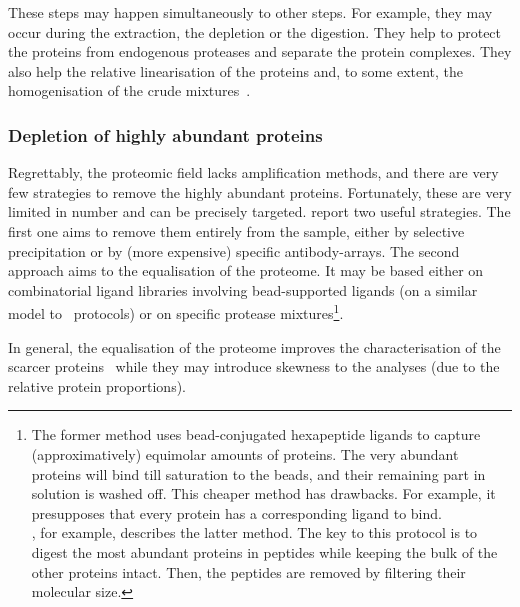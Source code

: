 These steps may happen simultaneously to other steps. For example, they may
occur during the extraction, the depletion or the digestion. They help to protect
the proteins from endogenous proteases and separate the protein complexes. They
also help the relative linearisation of the proteins and, to some extent,
the homogenisation of the crude mixtures~.

\subsubsection{Depletion of highly abundant proteins}

Regrettably, the proteomic field lacks amplification methods, and
there are very few strategies to remove the highly abundant proteins. Fortunately,
these are very limited in number and can be precisely targeted.
\citet{Zhang2014} report two useful strategies. The first one aims to remove
them entirely from the sample, either by selective
precipitation or by (more expensive) specific antibody-arrays.
The second approach aims to the equalisation of the proteome.
It may be based either on combinatorial ligand libraries involving
bead-supported ligands (on a similar model to \Rnaseq\ protocols)
or on specific protease mixtures\footnote{The former method uses bead-conjugated
hexapeptide ligands to capture (approximatively) equimolar amounts of proteins.
The very abundant proteins will bind till saturation to the beads, and their
remaining part in solution is washed off. This cheaper method has drawbacks.
For example, it presupposes that every protein has a corresponding ligand to bind.
\\\citet{MichaelMentenDepletion}, for example, describes the latter method. The
key to this protocol is to digest the most abundant proteins in peptides while
keeping the bulk of the other proteins intact.
Then, the peptides are removed by filtering their molecular size.}.

In general, the equalisation of the proteome improves the characterisation
of the scarcer proteins~ while they may introduce skewness
to the analyses (due to the relative protein proportions).

